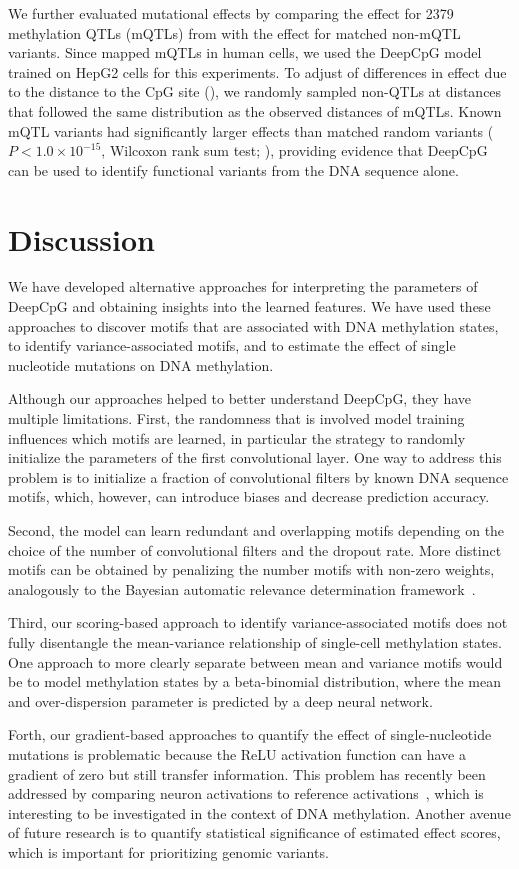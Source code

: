 We further evaluated mutational effects by comparing the effect for 2379 methylation QTLs (mQTLs) from \citet{kaplow_pooling-based_2015} with the effect for matched non-mQTL variants. Since \citet{kaplow_pooling-based_2015} mapped mQTLs in human cells, we used the DeepCpG model trained on HepG2 cells for this experiments. To adjust of differences in effect due to the distance to the CpG site (), we randomly sampled non-QTLs at distances that followed the same distribution as the observed distances of mQTLs. Known mQTL variants had significantly larger effects than matched random variants ($P<1.0\times10^{-15}$, Wilcoxon rank sum test; ), providing evidence that DeepCpG can be used to identify functional variants from the DNA sequence alone.


\section{Discussion}

We have developed alternative approaches for interpreting the parameters of DeepCpG and obtaining insights into the learned features. We have used these approaches to discover motifs that are associated with DNA methylation states, to identify variance-associated motifs, and to estimate the effect of single nucleotide mutations on DNA methylation.

Although our approaches helped to better understand DeepCpG, they have multiple limitations. First, the randomness that is involved model training influences which motifs are learned, in particular the strategy to randomly initialize the parameters of the first convolutional layer. One way to address this problem is to initialize a fraction of convolutional filters by known DNA sequence motifs, which, however, can introduce biases and decrease prediction accuracy.

Second, the model can learn redundant and overlapping motifs depending on the choice of the number of convolutional filters and the dropout rate. More distinct motifs can be obtained by penalizing the number motifs with non-zero weights, analogously to the Bayesian automatic relevance determination framework~\citep{mackay_bayesian_1992,neal_bayesian_2012}.

Third, our scoring-based approach to identify variance-associated motifs does not fully disentangle the mean-variance relationship of single-cell methylation states. One approach to more clearly separate between mean and variance motifs would be to model methylation states by a beta-binomial distribution, where the mean and over-dispersion parameter is predicted by a deep neural network.

Forth, our gradient-based approaches to quantify the effect of single-nucleotide mutations is problematic because the ReLU activation function can have a gradient of zero but still transfer information. This problem has recently been addressed by comparing neuron activations to reference activations~\citep{shrikumar_not_2016}, which is interesting to be investigated in the context of DNA methylation. Another avenue of future research is to quantify statistical significance of estimated effect scores, which is important for prioritizing genomic variants.
